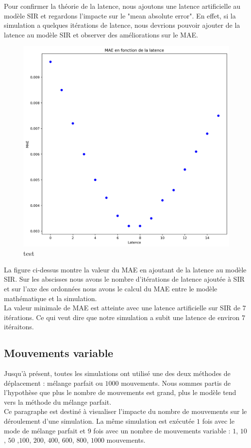 Pour confirmer la théorie de la latence, nous ajoutons une latence artificielle au modèle SIR et regardons l'impacte sur le "mean absolute error". En effet, si la simulation a quelques itérations de latence, nous devrions pouvoir ajouter de la latence au modèle SIR et observer des améliorations sur le MAE.

\begin{figure}[h]
	\centering
	\captionsetup{justification=centering}
	\includegraphics[width=.6\textwidth]{Images/SIR_latence_8_5.png}
	\caption{test}
\end{figure}

La figure ci-dessus montre la valeur du MAE en ajoutant de la latence au modèle SIR. Sur les abscisses nous avons le nombre d'itérations de latence ajoutée à SIR et sur l'axe des ordonnées nous avons le calcul du MAE entre le modèle mathématique et la simulation.\\

La valeur minimale de MAE est atteinte avec une latence artificielle sur SIR de $7$ itérations. Ce qui veut dire que notre simulation a subit une latence de environ $7$ itéraitons.

\subsection{Mouvements variable}

Jusqu'à présent, toutes les simulations ont utilisé une des deux méthodes de déplacement : mélange parfait ou $1000$ mouvements. Nous sommes partis de l'hypothèse que plus le nombre de mouvements est grand, plus le modèle tend vers la méthode du mélange parfait.\\

Ce paragraphe est destiné à visualiser l'impacte du nombre de mouvements sur le déroulement d'une simulation. La même simulation est exécutée $1$ fois avec le mode de mélange parfait et $9$ fois avec un nombre de mouvements variable : $1$, $10$, $50$ ,$100$, $200$, $400$, $600$, $800$, $1000$ mouvements.

